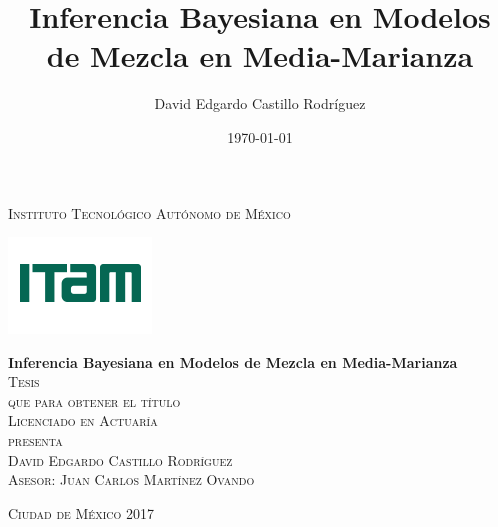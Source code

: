 \documentclass[letterpaper,onside,11pt]{book}
\title{Inferencia Bayesiana en Modelos de Mezcla en Media-Marianza}
\author{David Edgardo Castillo Rodr\'iguez}
\date{\today}
\begin{document}
 

\begin{titlepage}
	\begin{center}
		
		\textsc{\Large Instituto Tecnol\'ogico Aut\'onomo de M\'exico}\\[4em]
		
		\begin{center}
			\includegraphics{DocumentosLaTex/ITAM_2016.png}
		\end{center}
		
		\vspace{2em}
		
		{\sc \huge {\bf Inferencia Bayesiana en Modelos de Mezcla en Media-Marianza}}\\[4em]
		
		\textsc{\large Tesis}\\[1em]
		
		\textsc{que para obtener el t\'itulo}\\[1em]
		
		\textsc{Licenciado en Actuar\'ia}\\[1em]
		
		\textsc{presenta}\\[1em]
		
		\textsc{\Large David Edgardo Castillo Rodr\'iguez}\\[1em]
		
		\textsc{\large Asesor: Juan Carlos Mart\'inez Ovando}
		
	\end{center}
	
	\vspace*{\fill}
	\textsc{Ciudad de M\'exico \hspace*{\fill} 2017}
	
\end{titlepage}

%	
\tableofcontents




%
%


\medskip
{}



\appendix
	
	
	
	
\end{document}
